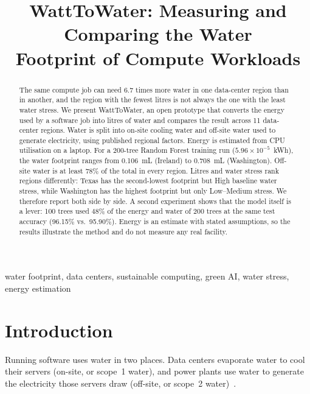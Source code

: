 \documentclass[conference]{IEEEtran}
\begin{document}
\title{WattToWater: Measuring and Comparing the Water\\Footprint of Compute Workloads}

\author{
}

\maketitle

\begin{abstract}
The same compute job can need 6.7 times more water in one data-center region than in another, and the region with the fewest litres is not always the one with the least water stress. We present WattToWater, an open prototype that converts the energy used by a software job into litres of water and compares the result across 11 data-center regions. Water is split into on-site cooling water and off-site water used to generate electricity, using published regional factors. Energy is estimated from CPU utilisation on a laptop. For a 200-tree Random Forest training run ($5.96\times10^{-5}$~kWh), the water footprint ranges from 0.106~mL (Ireland) to 0.708~mL (Washington). Off-site water is at least 78\% of the total in every region. Litres and water stress rank regions differently: Texas has the second-lowest footprint but High baseline water stress, while Washington has the highest footprint but only Low--Medium stress. We therefore report both side by side. A second experiment shows that the model itself is a lever: 100 trees used 48\% of the energy and water of 200 trees at the same test accuracy (96.15\% vs.\ 95.90\%). Energy is an estimate with stated assumptions, so the results illustrate the method and do not measure any real facility.
\end{abstract}

\begin{IEEEkeywords}
water footprint, data centers, sustainable computing, green AI, water stress, energy estimation
\end{IEEEkeywords}

\section{Introduction}

Running software uses water in two places. Data centers evaporate water to cool their servers (on-site, or scope~1 water), and power plants use water to generate the electricity those servers draw (off-site, or scope~2 water)~\cite{li2023thirsty}.
\end{document}
